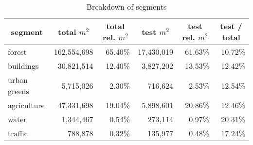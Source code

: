 \begin{table}[h]
\centering
\begin{tabular}{|l|r|r|r|r|r|}
\hline
\multicolumn{1}{|c|}{\textbf{segment}} &
  \multicolumn{1}{c|}{\textbf{total $m^2$}} &
  \multicolumn{1}{c|}{\textbf{total rel. $m^2$}} &
  \multicolumn{1}{c|}{\textbf{test $m^2$}} &
  \multicolumn{1}{c|}{\textbf{test rel. $m^2$}} &
  \multicolumn{1}{c|}{\textbf{test / total}} \\ \hline
forest       & 162,554,698 & 65.40\% & 17,430,019 & 61.63\% & 10.72\% \\ \hline
buildings    & 30,821,514  & 12.40\% & 3,827,202  & 13.53\% & 12.42\% \\ \hline
urban greens & 5,715,026   & 2.30\%  & 716,624    & 2.53\%  & 12.54\% \\ \hline
agriculture  & 47,331,698  & 19.04\% & 5,898,601  & 20.86\% & 12.46\% \\ \hline
water        & 1,344,467   & 0.54\%  & 273,114    & 0.97\%  & 20.31\% \\ \hline
traffic      & 788,878     & 0.32\%  & 135,977    & 0.48\%  & 17.24\% \\ \hline
\end{tabular}
\caption{Breakdown of segments}
\label{tab:seg-breakdown}
\end{table}

\newpage
